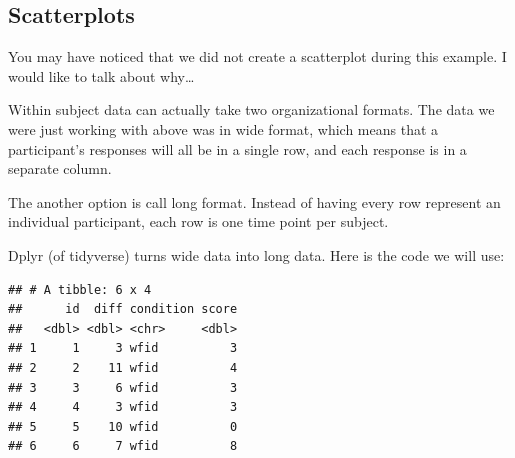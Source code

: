 \documentclass[
]{book}
\newenvironment{Shaded}{\begin{snugshade}}{\end{snugshade}}
\newcommand{\DataTypeTok}[1]{\textcolor[rgb]{0.13,0.29,0.53}{#1}}
\newcommand{\KeywordTok}[1]{\textcolor[rgb]{0.13,0.29,0.53}{\textbf{#1}}}
\newcommand{\NormalTok}[1]{#1}
\newcommand{\OperatorTok}[1]{\textcolor[rgb]{0.81,0.36,0.00}{\textbf{#1}}}
\newcommand{\StringTok}[1]{\textcolor[rgb]{0.31,0.60,0.02}{#1}}
\begin{document}
\hypertarget{scatterplots-1}{%
\subsection{Scatterplots}\label{scatterplots-1}}

You may have noticed that we did not create a scatterplot during this example. I would like to talk about why\ldots{}

Within subject data can actually take two organizational formats. The data we were just working with above was in wide format, which means that a participant's responses will all be in a single row, and each response is in a separate column.

The another option is call long format. Instead of having every row represent an individual participant, each row is one time point per subject.

Dplyr (of tidyverse) turns wide data into long data. Here is the code we will use:

\begin{Shaded}
\end{Shaded}

\begin{verbatim}
## # A tibble: 6 x 4
##      id  diff condition score
##   <dbl> <dbl> <chr>     <dbl>
## 1     1     3 wfid          3
## 2     2    11 wfid          4
## 3     3     6 wfid          3
## 4     4     3 wfid          3
## 5     5    10 wfid          0
## 6     6     7 wfid          8
\end{verbatim}
\end{document}
